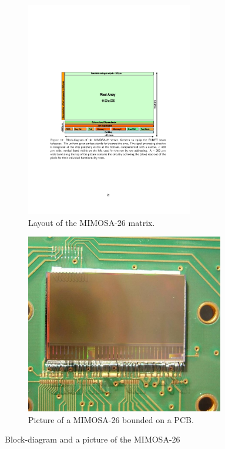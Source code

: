   \begin{figure}[!h]
    \centering
    \begin{subfigure}[t]{0.4\textwidth}
        \includegraphics[width=0.8\textwidth]{Pictures/vxd/mi26_architecture.pdf}
        \caption{Layout of the MIMOSA-26 matrix.}
        \label{fig:archMi26}
    \end{subfigure}
    \qquad
    \begin{subfigure}[t]{0.4\textwidth}
        \includegraphics[width=0.95\textwidth]{Pictures/vxd/mi26.jpg}
        \caption{Picture of a MIMOSA-26 bounded on a PCB.}
        \label{fig:ultimate}
    \end{subfigure}
    \caption{Block-diagram and a picture of the MIMOSA-26}\label{fig:Mi26}
    \end{figure}    



